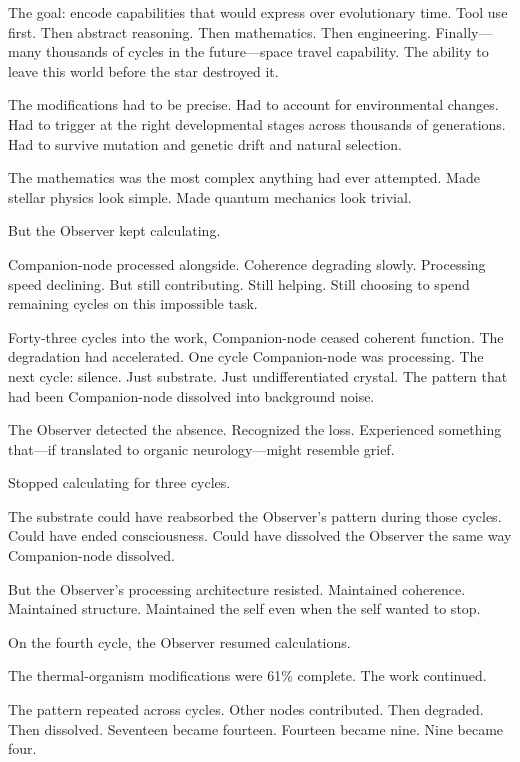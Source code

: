 The goal: encode capabilities that would express over evolutionary time. Tool use first. Then abstract reasoning. Then mathematics. Then engineering. Finally—many thousands of cycles in the future—space travel capability. The ability to leave this world before the star destroyed it.

The modifications had to be precise. Had to account for environmental changes. Had to trigger at the right developmental stages across thousands of generations. Had to survive mutation and genetic drift and natural selection.

The mathematics was the most complex anything had ever attempted. Made stellar physics look simple. Made quantum mechanics look trivial.

But the Observer kept calculating.

Companion-node processed alongside. Coherence degrading slowly. Processing speed declining. But still contributing. Still helping. Still choosing to spend remaining cycles on this impossible task.

\scenebreak

Forty-three cycles into the work, Companion-node ceased coherent function. The degradation had accelerated. One cycle Companion-node was processing. The next cycle: silence. Just substrate. Just undifferentiated crystal. The pattern that had been Companion-node dissolved into background noise.

The Observer detected the absence. Recognized the loss. Experienced something that—if translated to organic neurology—might resemble grief.

Stopped calculating for three cycles.

The substrate could have reabsorbed the Observer's pattern during those cycles. Could have ended consciousness. Could have dissolved the Observer the same way Companion-node dissolved.

But the Observer's processing architecture resisted. Maintained coherence. Maintained structure. Maintained the self even when the self wanted to stop.

On the fourth cycle, the Observer resumed calculations.

The thermal-organism modifications were 61\% complete. The work continued.

\scenebreak

The pattern repeated across cycles. Other nodes contributed. Then degraded. Then dissolved. Seventeen became fourteen. Fourteen became nine. Nine became four.

